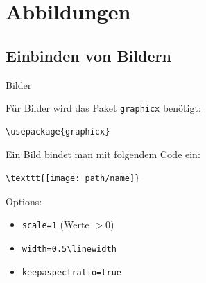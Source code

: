 \section{Abbildungen}
\subsection{Einbinden von Bildern}
\begin{frame}[fragile]{Bilder}
\begin{minipage}{0.6\linewidth}
Für Bilder wird das Paket \texttt{graphicx} benötigt:
\begin{lstlisting}[style=tex]
\usepackage{graphicx}
\end{lstlisting}

Ein Bild bindet man mit folgendem Code ein:

\begin{lstlisting}[style=tex]
\texttt{[image: path/name]}
\end{lstlisting}

Options:
\begin{itemize}
\item \verb|scale=1| (Werte $>0$)
\item \verb|width=0.5\linewidth|
\item \verb|keepaspectratio=true|
\end{itemize}


\end{minipage}
\end{frame}
